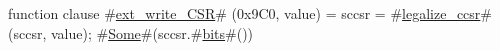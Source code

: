 function clause #\hyperref[sailRISCVzextzywritezyCSR]{ext\_write\_CSR}# (0x9C0, value) = { sccsr = #\hyperref[sailRISCVzlegalizzezyccsr]{legalize\_ccsr}#(sccsr, value); #\hyperref[sailRISCVzSome]{Some}#(sccsr.#\hyperref[sailRISCVzbits]{bits}#()) }
